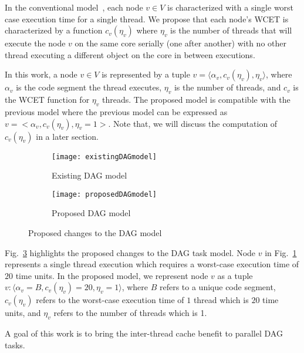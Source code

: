 In the conventional model~\cite{li2014analysis}, each node ${v \in V}$ is characterized
with a single worst case execution time for a single thread. We
propose that each node's WCET is characterized by a function
${c_{v}(\eta_{v})}$ where $\eta_{v}$ is the number of threads that will execute the
node ${v}$ on the same core serially (one after another) with no
other thread executing a different object on the core in between executions.

In this work, a node ${v \in V}$ is represented by a tuple ${v = \langle \alpha_{v}, c_{v}(\eta_{v}), \eta_{v} \rangle }$, where $\alpha_{v}$ is the code segment the thread executes, $\eta_{v}$ is the number of threads, and ${c_{v}}$ is the WCET function for ${\eta_v}$ threads. The proposed model is  compatible with the previous model \cite{li2014analysis} where the previous model can be expressed as ${v = <\alpha_{v}, c_{v}(\eta_v), \eta_v=1>}$. Note that, we will discuss the computation of $c_{v}(\eta_{v})$ in a later section.

\begin{figure}
  \centering
  \begin{subfigure}[b]{0.4\textwidth}{
      \texttt{[image: existingDAGmodel]}
      \caption{Existing DAG model}
      \label{fig:existingDAGmodel}
    }
  \end{subfigure} \quad
  \begin{subfigure}[b]{0.4\textwidth}{
      \texttt{[image: proposedDAGmodel]}
      \caption{Proposed DAG model}
      \label{fig:proposedDAGmodel}
    }
  \end{subfigure}
  \caption{Proposed changes to the DAG model}
  \label{fig:dag-change}
\end{figure}


Fig.~\ref{fig:dag-change} highlights the proposed changes to the DAG task model.  Node $v$ in Fig.~\ref{fig:existingDAGmodel} represents a single thread execution which requires a worst-case execution time of $20$ time units. In the proposed model, we represent node $v$ as a tuple $v : \langle \alpha_v = B, c_v(\eta_v) = 20,  \eta_v = 1\rangle$, where $B$ refers to a unique code segment, $ c_v(\eta_v)$ refers to the worst-case execution time of $1$ thread which is $20$ time units, and $\eta_v$ refers to the number of threads which is 1.

 A goal of this work is to bring the inter-thread cache benefit \addcite to parallel DAG tasks. 

